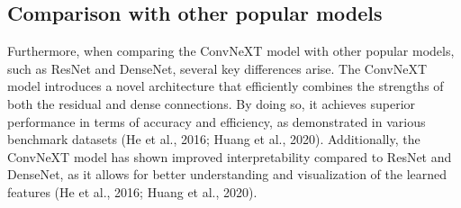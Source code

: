 \documentclass[12pt,oneside]{report}
\begin{document}
\subsection{Comparison with other popular models}
Furthermore, when comparing the ConvNeXT model with other popular models, such as ResNet and DenseNet, several key differences arise. The ConvNeXT model introduces a novel architecture that efficiently combines the strengths of both the residual and dense connections. By doing so, it achieves superior performance in terms of accuracy and efficiency, as demonstrated in various benchmark datasets (He et al., 2016; Huang et al., 2020). Additionally, the ConvNeXT model has shown improved interpretability compared to ResNet and DenseNet, as it allows for better understanding and visualization of the learned features (He et al., 2016; Huang et al., 2020).
\end{document}
